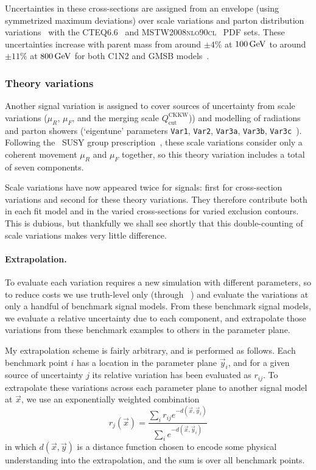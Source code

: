 Uncertainties in these cross-sections are assigned from an envelope
(using symmetrized maximum deviations)
over scale variations and parton distribution variations~\cite{Fuks:2012qx}
with the
\textsc{CTEQ6.6}~\cite{Nadolsky:2008cw} and
\textsc{MSTW2008nlo90cl}~\cite{Martin:2009iq} PDF sets.
These uncertainties increase with parent mass from around
$\pm4\%$ at $100\,\eV[G]$ to around
$\pm11\%$ at $800\,\eV[G]$ for both C1N2 and GMSB models~\cite{
atlas_twiki_xsec_c1n2,
atlas_twiki_xsec_hino
}.

\subsubsection{Theory variations}
\label{sec:2ljets_theory_variations}
Another signal variation is assigned to cover sources of uncertainty from
scale variations ($\mu_R$, $\mu_F$, and the merging scale
$Q_\textrm{cut}^\textrm{CKKW}$)) and modelling of radiations and parton
showers (`eigentune' parameters
\texttt{Var1},
\texttt{Var2},
\texttt{Var3a},
\texttt{Var3b},
\texttt{Var3c}~\cite{ATL-PHYS-PUB-2014-021}).
Following the \atlas\ SUSY group
prescription~\cite{atlas_twiki_susytheoretical},
these scale variations consider only a coherent movement $\mu_R$ and $\mu_F$
together, so this theory variation includes a total of seven components.

Scale variations have now appeared twice for signals:
first for cross-section variations and second for these theory variations.
They therefore contribute both in each fit model and in the varied
cross-sections for varied exclusion contours.
This is dubious, but thankfully we shall see shortly that this double-counting
of scale variations makes very little difference.

\paragraph{Extrapolation.}
To evaluate each variation requires a new simulation with different parameters,
so to reduce costs we use truth-level only
(through \simpleanalysis~\cite{simpleanalysis_cern}) and evaluate the
variations at only a handful of benchmark signal models.
From these benchmark signal models, we evaluate a relative uncertainty due
to each component, and extrapolate those variations from these benchmark
examples to others in the parameter plane.

My extrapolation scheme is fairly arbitrary, and is performed as follows.
Each benchmark point $i$ has a location in the parameter plane $\vec y_i$, and
for a given source of uncertainty $j$ its relative variation has been evaluated
as $r_{ij}$.
To extrapolate these variations across each parameter plane to another signal
model at $\vec x$, we use an exponentially weighted combination
\begin{equation}
\label{eqn:2ljets_signal_extrap}
r_j(\vec x) = \frac{
\sum_i r_{ij} e^{-d(\vec x, \vec y_i)}
}{
\sum_i e^{-d(\vec x, \vec y_i)}
}
\end{equation}
in which $d(\vec x, \vec y)$ is a distance function chosen to encode some
physical understanding into the extrapolation,
and the sum is over all benchmark points.

